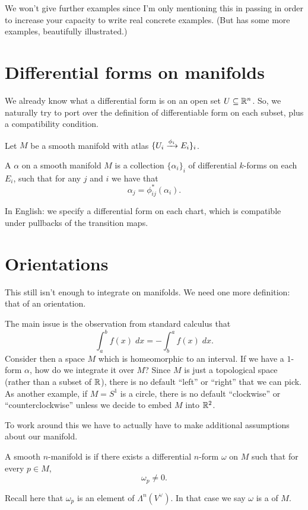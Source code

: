 We won't give further examples
since I'm only mentioning this in passing
in order to increase your capacity to write real concrete examples.
(But \cite[Chapter 6.2]{ref:manifolds} has some more examples,
beautifully illustrated.)

\section{Differential forms on manifolds}
We already know what a differential form is on an open set $U \subseteq \mathbb R^n$.
So, we naturally try to port over the definition of
differentiable form on each subset, plus a compatibility condition.

Let $M$ be a smooth manifold with atlas $\{ U_i \xrightarrow{\phi_i} E_i \}_i$.

\begin{definition}
	A  $\alpha$ on a smooth manifold $M$
	is a collection $\{\alpha_i\}_i$ of differential $k$-forms on each $E_i$,
	such that for any $j$ and $i$ we have that
	\[ \alpha_j = \phi_{ij}^\ast(\alpha_i). \]
\end{definition}
In English: we specify a differential form on each chart,
which is compatible under pullbacks of the transition maps.

\section{Orientations}

This still isn't enough to integrate on manifolds.
We need one more definition: that of an orientation.

The main issue is the observation from standard calculus that
\[ \int_a^b f(x) \; dx = - \int_b^a f(x) \; dx. \]
Consider then a space $M$ which is homeomorphic to an interval.
If we have a $1$-form $\alpha$, how do we integrate it over $M$?
Since $M$ is just a topological space (rather than a subset of $\mathbb R$),
there is no default ``left'' or ``right'' that we can pick.
As another example, if $M = S^1$ is a circle, there is
no default ``clockwise'' or ``counterclockwise'' unless we decide
to embed $M$ into $\mathbb R^2$.

To work around this we have to actually have to
make additional assumptions about our manifold.
\begin{definition}
	A smooth $n$-manifold is  if
	there exists a differential $n$-form $\omega$ on $M$
	such that for every $p \in M$,
	\[ \omega_p \neq 0. \]
\end{definition}
Recall here that $\omega_p$ is an element of $\Lambda^n(V^\vee)$.
In that case we say $\omega$ is a  of $M$.


